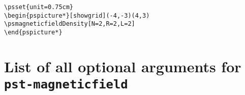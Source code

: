 \documentclass[11pt,english,BCOR10mm,DIV12,bibliography=totoc,parskip=false,smallheadings
    headexclude,footexclude,oneside]{pst-doc}
\begin{document}
\begin{lstlisting}
\psset{unit=0.75cm}
\begin{pspicture*}[showgrid](-4,-3)(4,3)
\psmagneticfieldDensity[N=2,R=2,L=2]
\end{pspicture*}
\end{lstlisting}


\clearpage
\section{List of all optional arguments for \texttt{pst-magneticfield}}


\nocite{*}
\bgroup
\raggedright


\egroup


\printindex
\end{document}

